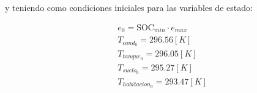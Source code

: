 y teniendo como condiciones iniciales para las variables de estado:

\begin{align}
	 & e_0 = \text{SOC}_{min} \cdot e_{max} \\
	 & T_{cond_0} = 296.56 [K]              \\
	 & T_{tanque_0} = 296.05[K]             \\
	 & T_{suelo_0} = 295.27[K]              \\
	 & T_{habitacion_0} = 293.47[K]         \\
\end{align}
